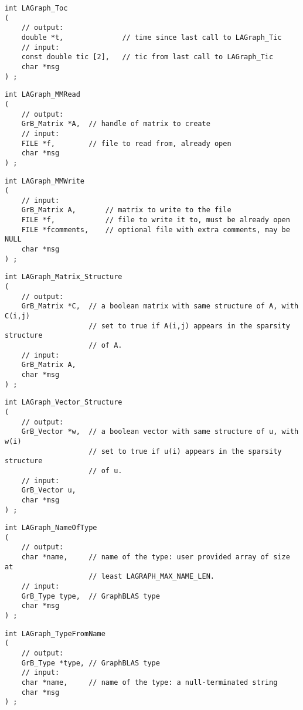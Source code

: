 \begin{verbatim}
int LAGraph_Toc
(
    // output:
    double *t,              // time since last call to LAGraph_Tic
    // input:
    const double tic [2],   // tic from last call to LAGraph_Tic
    char *msg
) ;
\end{verbatim}




\begin{verbatim}
int LAGraph_MMRead
(
    // output:
    GrB_Matrix *A,  // handle of matrix to create
    // input:
    FILE *f,        // file to read from, already open
    char *msg
) ;
\end{verbatim}




\begin{verbatim}
int LAGraph_MMWrite
(
    // input:
    GrB_Matrix A,       // matrix to write to the file
    FILE *f,            // file to write it to, must be already open
    FILE *fcomments,    // optional file with extra comments, may be NULL
    char *msg
) ;
\end{verbatim}




\begin{verbatim}
int LAGraph_Matrix_Structure
(
    // output:
    GrB_Matrix *C,  // a boolean matrix with same structure of A, with C(i,j)
                    // set to true if A(i,j) appears in the sparsity structure
                    // of A.
    // input:
    GrB_Matrix A,
    char *msg
) ;
\end{verbatim}




\begin{verbatim}
int LAGraph_Vector_Structure
(
    // output:
    GrB_Vector *w,  // a boolean vector with same structure of u, with w(i)
                    // set to true if u(i) appears in the sparsity structure
                    // of u.
    // input:
    GrB_Vector u,
    char *msg
) ;
\end{verbatim}




\begin{verbatim}
int LAGraph_NameOfType
(
    // output:
    char *name,     // name of the type: user provided array of size at
                    // least LAGRAPH_MAX_NAME_LEN.
    // input:
    GrB_Type type,  // GraphBLAS type
    char *msg
) ;
\end{verbatim}




\begin{verbatim}
int LAGraph_TypeFromName
(
    // output:
    GrB_Type *type, // GraphBLAS type
    // input:
    char *name,     // name of the type: a null-terminated string
    char *msg
) ;
\end{verbatim}




